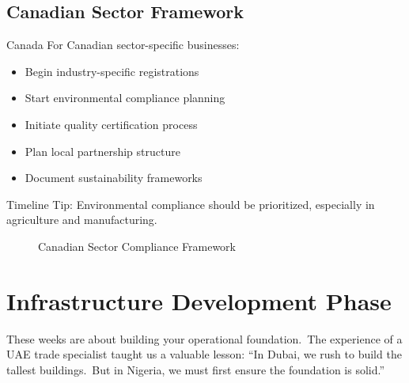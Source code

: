 \subsection{Canadian Sector Framework}\label{subsec:canadian-setup}
\begin{regionalbox}{Canada}
For Canadian sector-specific businesses:
\begin{itemize}
    \item Begin industry-specific registrations
    \item Start environmental compliance planning
    \item Initiate quality certification process
    \item Plan local partnership structure
    \item Document sustainability frameworks
\end{itemize}

Timeline Tip: Environmental compliance should be prioritized, especially in agriculture and manufacturing.

\begin{figure}[htbp]
    \centering
    \caption{Canadian Sector Compliance Framework}
    \label{fig:canadian-framework}
\end{figure}
\end{regionalbox}

\section{Infrastructure Development Phase}\label{sec:infrastructure-phase}

These weeks are about building your operational foundation.\ The experience of a UAE trade specialist taught us a valuable lesson: ``In Dubai, we rush to build the tallest buildings.\ But in Nigeria, we must first ensure the foundation is solid.''

